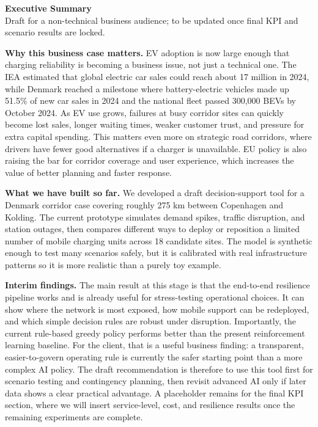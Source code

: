 \documentclass[10pt]{article}
\begin{document}
{\LARGE \textbf{Executive Summary}}\\
{\small Draft for a non-technical business audience; to be updated once final KPI and scenario results are locked.}

\vspace{0.5em}
\small

\textbf{Why this business case matters.} EV adoption is now large enough that charging reliability is becoming a business issue, not just a technical one. The IEA estimated that global electric car sales could reach about 17 million in 2024, while Denmark reached a milestone where battery-electric vehicles made up 51.5\% of new car sales in 2024 and the national fleet passed 300,000 BEVs by October 2024. As EV use grows, failures at busy corridor sites can quickly become lost sales, longer waiting times, weaker customer trust, and pressure for extra capital spending. This matters even more on strategic road corridors, where drivers have fewer good alternatives if a charger is unavailable. EU policy is also raising the bar for corridor coverage and user experience, which increases the value of better planning and faster response.

\textbf{What we have built so far.} We developed a draft decision-support tool for a Denmark corridor case covering roughly 275 km between Copenhagen and Kolding. The current prototype simulates demand spikes, traffic disruption, and station outages, then compares different ways to deploy or reposition a limited number of mobile charging units across 18 candidate sites. The model is synthetic enough to test many scenarios safely, but it is calibrated with real infrastructure patterns so it is more realistic than a purely toy example.

\textbf{Interim findings.} The main result at this stage is that the end-to-end resilience pipeline works and is already useful for stress-testing operational choices. It can show where the network is most exposed, how mobile support can be redeployed, and which simple decision rules are robust under disruption. Importantly, the current rule-based greedy policy performs better than the present reinforcement learning baseline. For the client, that is a useful business finding: a transparent, easier-to-govern operating rule is currently the safer starting point than a more complex AI policy. The draft recommendation is therefore to use this tool first for scenario testing and contingency planning, then revisit advanced AI only if later data shows a clear practical advantage. A placeholder remains for the final KPI section, where we will insert service-level, cost, and resilience results once the remaining experiments are complete.
\end{document}
